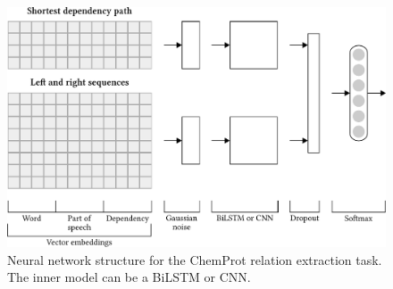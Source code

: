 \begin{figure}[!tb]
\centerline{\includegraphics[width=\textwidth]{img/chemprot-network/v6/img.pdf}}
\caption[Neural network structure for the ChemProt relation extraction task.]{Neural network structure for the ChemProt relation extraction task. The inner model can be a BiLSTM or CNN.}
\label{fig:chemprot-network}
\end{figure}
